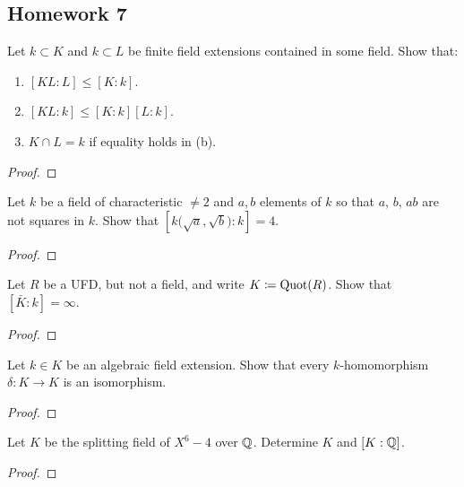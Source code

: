 \subsection{Homework 7}
\begin{problem}
  Let $k\subset K$ and $k\subset L$ be finite field extensions contained in
  some field. Show that:
  \begin{enumerate}[label=(\alph*),noitemsep]
  \item $[KL:L]\leq [K:k]$.
  \item $[KL:k]\leq [K:k][L:k]$.
  \item $K\cap L=k$ if equality holds in (b).
  \end{enumerate}
\end{problem}
\begin{proof}
\end{proof}

\begin{problem}
  Let $k$ be a field of characteristic $\neq 2$ and $a,b$ elements of $k$
  so that $a$, $b$, $ab$ are not squares in $k$. Show that
  $\left[k{\bigl(\sqrt{a},\sqrt{b}\bigr)}:k\right]=4$.
\end{problem}
\begin{proof}
\end{proof}

\begin{problem}
  Let $R$ be a UFD, but not a field, and write $K\coloneq\operatorname{Quot}(R)$. Show
  that $[\bar K:k]=\infty$.
\end{problem}
\begin{proof}
\end{proof}

\begin{problem}
  Let $k\in K$ be an algebraic field extension. Show that every
  $k$-homomorphism $\delta\colon K\to K$ is an isomorphism.
\end{problem}
\begin{proof}
\end{proof}

\begin{problem}
  Let $K$ be the splitting field of $X^6-4$ over $\mathbb{Q}$. Determine $K$ and
  $[K:\mathbb{Q}]$.
\end{problem}
\begin{proof}
\end{proof}

